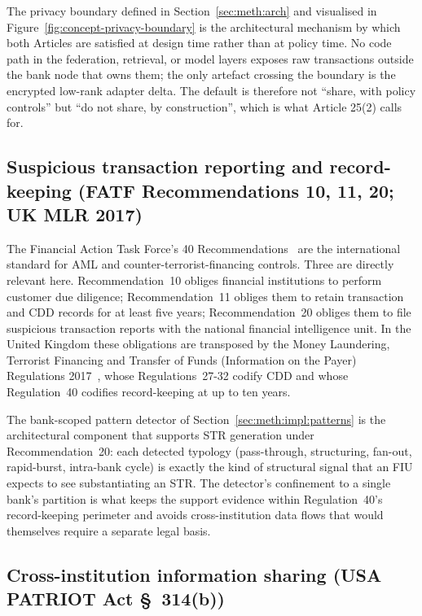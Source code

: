 \documentclass{report}
\begin{document}
The privacy boundary defined in Section~\ref{sec:meth:arch} and visualised in Figure~\ref{fig:concept-privacy-boundary} is the architectural mechanism by which both Articles are satisfied at design time rather than at policy time. No code path in the federation, retrieval, or model layers exposes raw transactions outside the bank node that owns them; the only artefact crossing the boundary is the encrypted low-rank adapter delta. The default is therefore not ``share, with policy controls'' but ``do not share, by construction'', which is what Article 25(2) calls for.

\subsection{Suspicious transaction reporting and record-keeping (FATF Recommendations 10, 11, 20; UK MLR 2017)}

The Financial Action Task Force's 40 Recommendations~\cite{fatf2025recommendations} are the international standard for AML and counter-terrorist-financing controls. Three are directly relevant here. Recommendation~10 obliges financial institutions to perform customer due diligence; Recommendation~11 obliges them to retain transaction and CDD records for at least five years; Recommendation~20 obliges them to file suspicious transaction reports with the national financial intelligence unit. In the United Kingdom these obligations are transposed by the Money Laundering, Terrorist Financing and Transfer of Funds (Information on the Payer) Regulations 2017~\cite{ukmlr2017}, whose Regulations~27-32 codify CDD and whose Regulation~40 codifies record-keeping at up to ten years.

The bank-scoped pattern detector of Section~\ref{sec:meth:impl:patterns} is the architectural component that supports STR generation under Recommendation~20: each detected typology (pass-through, structuring, fan-out, rapid-burst, intra-bank cycle) is exactly the kind of structural signal that an FIU expects to see substantiating an STR. The detector's confinement to a single bank's partition is what keeps the support evidence within Regulation~40's record-keeping perimeter and avoids cross-institution data flows that would themselves require a separate legal basis.

\subsection{Cross-institution information sharing (USA PATRIOT Act \texorpdfstring{\S}{Section}~314(b))}
\end{document}
